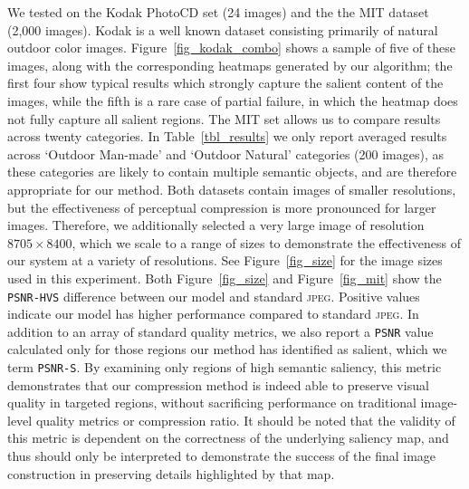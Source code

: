 We tested on the Kodak PhotoCD set (24 images) and the the MIT dataset (2,000 images).
Kodak is a well known dataset consisting primarily of natural outdoor color images.
Figure~\ref{fig_kodak_combo} shows a sample of five of these images, along with the corresponding heatmaps generated by our algorithm; the first four show typical results which strongly capture the salient content of the images, while the fifth is a rare case of partial failure, in which the heatmap does not fully capture all salient regions.
The MIT set allows us to compare results across twenty categories. In Table~\ref{tbl_results} we only report averaged results across `Outdoor Man-made' and `Outdoor Natural' categories (200 images), as these categories are likely to contain multiple semantic objects, and are therefore appropriate for our method.
Both datasets contain images of smaller resolutions, but the effectiveness of perceptual compression is more pronounced for larger images.
Therefore, we additionally selected a very large image of resolution $8705\times8400$, which we scale to a range of sizes to demonstrate the effectiveness of our system at a variety of resolutions.
See Figure~\ref{fig_size} for the image sizes used in this experiment.
Both Figure~\ref{fig_size} and Figure~\ref{fig_mit} show the \texttt{PSNR-HVS} difference between our model and standard \textsc{jpeg}. Positive values indicate our model has higher performance compared to standard \textsc{jpeg}.
In addition to an array of standard quality metrics, we also report a \texttt{PSNR} value calculated only for those regions our method has identified as salient, which we term \texttt{PSNR-S}.
By examining only regions of high semantic saliency, this metric demonstrates that our compression method is indeed able to preserve visual quality in targeted regions, without sacrificing performance on traditional image-level quality metrics or compression ratio.
It should be noted that the validity of this metric is dependent on the correctness of the underlying saliency map, and thus should only be interpreted to demonstrate the success of the final image construction in preserving details highlighted by that map.

